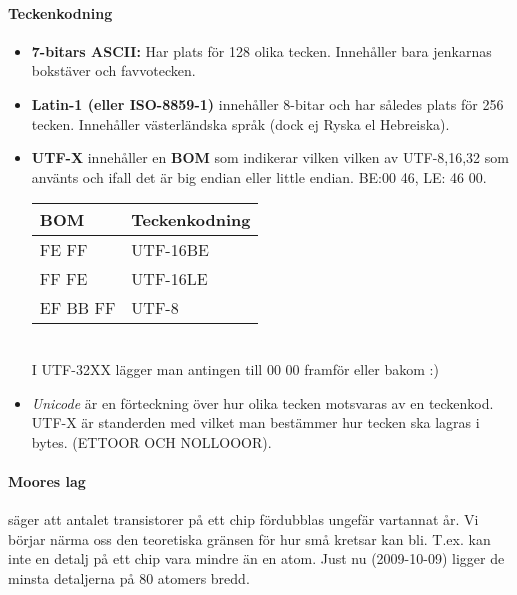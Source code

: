 \documentclass[a4paper]{article}
\begin{document}



\paragraph{Teckenkodning}
\begin{itemize}
\item \textbf{7-bitars ASCII:} Har plats för 128 olika tecken. Innehåller bara jenkarnas bokstäver och favvotecken.

\item \textbf{Latin-1 (eller ISO-8859-1)} innehåller 8-bitar och har således plats för 256 tecken. Innehåller västerländska språk (dock ej Ryska el Hebreiska).

\item \textbf{UTF-X} innehåller en \textbf{BOM} som indikerar vilken vilken av UTF-8,16,32 som använts och ifall det är big endian eller little endian. BE:00 46, LE: 46 00.\\

\begin{tabular}{l|l}
\textbf{BOM} & \textbf{Teckenkodning} \\
\hline
FE FF & UTF-16BE \\
FF FE & UTF-16LE \\
EF BB FF & UTF-8
\end{tabular}\\

I UTF-32XX lägger man antingen till 00 00 framför eller bakom :)

\item \emph{Unicode} är en förteckning över hur olika tecken motsvaras av en teckenkod. UTF-X är standerden med vilket man bestämmer hur tecken ska lagras i bytes. (ETTOOR OCH NOLLOOOR).
\end{itemize}

\paragraph{Moores lag}säger att antalet transistorer på ett chip fördubblas ungefär vartannat år. Vi börjar närma oss den teoretiska gränsen för hur små kretsar kan bli. T.ex. kan inte en detalj på ett chip vara mindre än en atom. Just nu (2009-10-09) ligger de minsta detaljerna på 80 atomers bredd.
\end{document}
